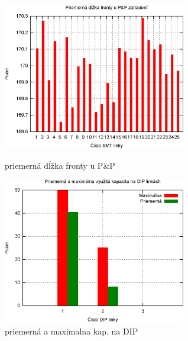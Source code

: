\documentclass[12pt,a4paper,titlepage,final]{article}
\begin{document}
\begin{figure}[!ht]
  \centering
  \begin{minipage}{0.45\linewidth}
  \centering
  \includegraphics[width=8cm]{doc/3_hist3.eps}
  \caption{priemerná dĺžka fronty u P\&P}
  \end{minipage}
  \quad
  \begin{minipage}{0.45\linewidth}
    \centering
    \includegraphics[width=8cm]{doc/3_hist4.eps}
    \caption{priemerná a maximalna kap. na DIP}
  \end{minipage}
\end{figure}
\end{document}
